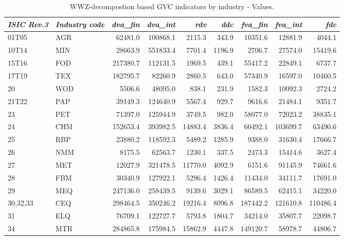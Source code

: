 \documentclass[a4paper,11pt]{article}
\begin{document}
\begin{table}[h]\small
  \centering
       \caption{WWZ-decompostion based GVC indicators by industry - Values.}
           \hspace*{-1.9cm}
    \begin{tabular}{llrrrrrrr}
    \toprule
    \textit{ISIC Rev.3} & \textit{Industry code} & \textit{dva\_fin} & \textit{dva\_int} & \textit{rdv} & \textit{ddc} & \textit{fva\_fin} & \textit{fva\_int} & \textit{fdc} \\
    \midrule
    01T05 & AGR   & 62481.0 & 100868.1 & 2115.3 & 343.9 & 10351.6 & 12881.9 & 4044.1 \\
    10T14 & MIN   & 28663.9 & 551833.4 & 7701.4 & 1196.9 & 2706.7 & 27574.0 & 15419.6 \\
    15T16 & FOD   & 217380.7 & 112131.5 & 1969.5 & 439.1 & 55417.2 & 22849.1 & 6737.7 \\
    17T19 & TEX   & 182795.7 & 82260.9 & 2860.5 & 643.0 & 57340.9 & 16597.0 & 10460.5 \\
    20    & WOD   & 5506.6 & 48095.0 & 838.1 & 231.9 & 1582.3 & 10092.3 & 2724.2 \\
    21T22 & PAP   & 39149.3 & 124640.9 & 5567.4 & 929.7 & 9616.6 & 21484.1 & 9351.7 \\
    23    & PET   & 71397.0 & 125944.9 & 3749.5 & 982.0 & 58077.0 & 72023.2 & 38835.1 \\
    24    & CHM   & 152653.4 & 393982.5 & 14883.4 & 3836.4 & 60492.1 & 103699.7 & 63490.6 \\
    25    & RBP   & 23880.2 & 118592.3 & 5489.2 & 1285.9 & 9388.0 & 31630.4 & 17666.7 \\
    26    & NMM   & 8175.5 & 62563.7 & 1230.1 & 337.5 & 2473.3 & 15414.6 & 3627.4 \\
    27    & MET   & 12027.9 & 321478.5 & 11770.0 & 4092.9 & 6151.6 & 91145.9 & 74661.6 \\
    28    & FBM   & 30340.9 & 127922.1 & 5296.4 & 1426.4 & 11434.0 & 34111.7 & 17691.0 \\
    29    & MEQ   & 247136.0 & 258439.5 & 9139.6 & 3029.1 & 86589.5 & 62415.1 & 34220.0 \\
    30,32,33 & CEQ   & 298464.5 & 350246.2 & 19216.4 & 8096.8 & 187442.2 & 121610.8 & 110486.4 \\
    31    & ELQ   & 76709.1 & 122727.7 & 5793.8 & 1804.7 & 34214.0 & 35807.7 & 22098.7 \\
    34    & MTR   & 284865.8 & 175984.5 & 15862.9 & 4447.8 & 149120.7 & 58978.7 & 44806.7 \\

\end{tabular}
\end{table}
\end{document}
